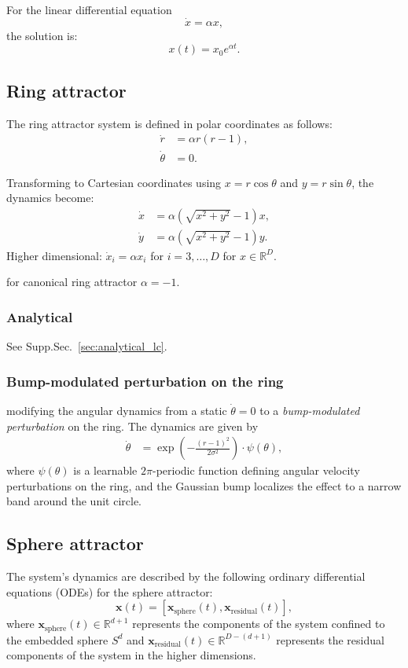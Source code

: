 \documentclass{article}
\theoremstyle{definition} \newtheorem{definition}{Definition}  \newtheorem{example}{Example}
\theoremstyle{remark} \newtheorem{remark}{Remark}
\newcommand{\reals}{\mathbb{R}}
\newcounter{ct}
\begin{document}
For the linear differential equation
\[
\dot{x} = \alpha x,
\]
the solution is:
\[
x(t) = x_0 e^{\alpha t}.
\]


\subsection{Ring attractor}
The ring attractor system is defined in polar coordinates as follows:
\[
\begin{aligned}
\dot{r} &= \alpha r(r - 1), \\
\dot{\theta} &= 0.
\end{aligned}
\]

Transforming to Cartesian coordinates using \( x = r \cos\theta \) and \( y = r \sin\theta \), the dynamics become:
\[
\begin{aligned}
\dot{x} &= \alpha\left( \sqrt{x^2 + y^2} - 1 \right) x, \\
\dot{y} &= \alpha\left( \sqrt{x^2 + y^2} - 1 \right) y.
\end{aligned}
\]
Higher dimensional: $\dot x_i = \alpha x_i$ for $i=3, \dots, D$ for $x\in \reals^D$.

for canonical ring attractor $\alpha=-1$.


\subsubsection{Analytical}
See Supp.Sec.~\ref{sec:analytical_lc}.


\subsubsection{Bump-modulated perturbation on the ring}
modifying the angular dynamics from a static $\dot\theta=0$ to a \emph{bump-modulated perturbation} on the ring.
The dynamics are given by
\begin{align}
\dot{\theta} &= \exp\left(-\frac{(r - 1)^2}{2\sigma^2} \right) \cdot \psi(\theta), \label{eq:bumpmod_angular}
\end{align}
where \( \psi(\theta) \) is a learnable \( 2\pi \)-periodic function defining angular velocity perturbations on the ring, and the Gaussian bump localizes the effect to a narrow band around the unit circle.


\subsection{Sphere attractor}
The system's dynamics are described by the following ordinary differential equations (ODEs) for the sphere attractor:
\begin{equation}
 \mathbf{x}(t) = \left[ \mathbf{x}_{\text{sphere}}(t), \mathbf{x}_{\text{residual}}(t) \right],
\end{equation}
 where \( \mathbf{x}_{\text{sphere}}(t) \in \mathbb{R}^{d+1} \) represents the components of the system confined to the embedded sphere \( S^d \) and \( \mathbf{x}_{\text{residual}}(t) \in \mathbb{R}^{D - (d+1)} \) represents the residual components of the system in the higher dimensions.
\end{document}
